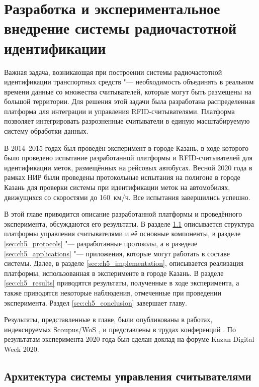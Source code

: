 \chapter{Разработка и экспериментальное внедрение системы радиочастотной идентификации}\label{ch:ch5}
Важная задача, возникающая при построении системы радиочастотной идентификации транспортных средств "--- необходимость объединять в реальном времени данные со множества считывателей, которые могут быть размещены на большой территории. Для решения этой задачи была разработана распределенная платформа для интеграции и управления RFID-считывателями. Платформа позволяет интегрировать разрозненные считыватели в единую масштабируемую систему обработки данных.

В 2014--2015 годах был проведён эксперимент в городе Казань, в ходе которого было проведено испытание разработанной платформы и RFID-считывателей для идентификации меток, размещённых на рейсовых автобусах. Весной 2020 года в рамках НИР были проведены протокольные испытания на полигоне в городе Казань для проверки системы при идентификации меток на автомобилях, движущихся со скоростями до 160~км/ч. Все испытания завершились успешно.

В этой главе приводится описание разработанной платформы и проведённого эксперимента, обсуждаются его результаты. В разделе \ref{sec:ch5_architecture} описывается структура платформы управления считывателями и её основные компоненты, в разделе \ref{sec:ch5_protocols} "--- разработанные протоколы, а в разеделе \ref{sec:ch5_applications} "--- приложения, которые могут работать в составе системы. Далее, в разделе \ref{sec:ch5_implementation}, описывается реализация платформы, использованная в эксперименте в городе Казань. В разделе \ref{sec:ch5_results} приводятся результаты, полученные в ходе эксперимента, а также приводятся некоторые наблюдения, отмеченные при проведении эксперимента. Раздел \ref{sec:ch5_conclusion} завершает главу.

Результаты, представленные в главе, были опубликованы в работах, индексируемых Scoupus/WoS \cite{RFIDCTRL_NETS2CARS2014, RFIDTA2012}, и представлены в трудах конференций \cite{RFIDCTRL_DCCN2017, RFIDCTRL_VSPU2014}. По результатам эксперимента 2020 года был сделан доклад на форуме Kazan Digital Week 2020.


\section{Архитектура системы управления считывателями}\label{sec:ch5_architecture}

